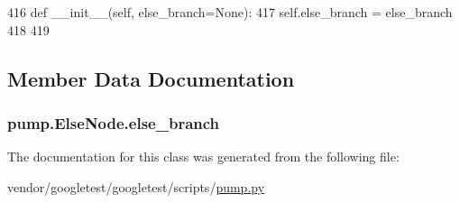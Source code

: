 \begin{DoxyCode}
416   \textcolor{keyword}{def }\_\_init\_\_(self, else\_branch=None):
417     self.else\_branch = else\_branch
418 
419 
\end{DoxyCode}


\subsection{Member Data Documentation}
\subsubsection[{\texorpdfstring{else\+\_\+branch}{else_branch}}]{\setlength{\rightskip}{0pt plus 5cm}pump.\+Else\+Node.\+else\+\_\+branch}\hypertarget{classpump_1_1ElseNode_ac838a0fe9f5d713c7f56939eed5e128d}{}\label{classpump_1_1ElseNode_ac838a0fe9f5d713c7f56939eed5e128d}


The documentation for this class was generated from the following file\+:\begin{DoxyCompactItemize}
\item 
vendor/googletest/googletest/scripts/\hyperlink{pump_8py}{pump.\+py}\end{DoxyCompactItemize}
